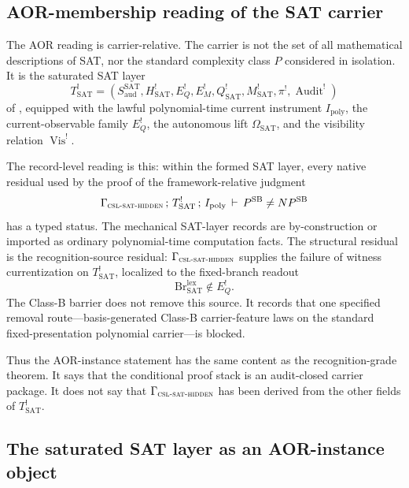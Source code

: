 \documentclass[11pt]{article}
\newcommand{\Tsat}{T^{!}_{\mathrm{SAT}}}
\newcommand{\Saud}{S_{\mathrm{aud}}^{\mathrm{SAT}}}
\newcommand{\Hsat}{H^{!}_{\mathrm{SAT}}}
\newcommand{\Ipoly}{I_{\mathrm{poly}}}
\newcommand{\EQbang}{E^{!}_{Q}}
\newcommand{\EMbang}{E^{!}_{M}}
\newcommand{\Qsat}{Q^{!}_{\mathrm{SAT}}}
\newcommand{\Msat}{M^{!}_{\mathrm{SAT}}}
\newcommand{\ComparisonMap}{\pi^{!}}
\newcommand{\OmegaSAT}{\Omega_{\mathrm{SAT}}}
\newcommand{\VisBang}{\operatorname{Vis}^{!}}
\newcommand{\CSLSATHidden}{\Gamma_{\textsc{csl-sat-hidden}}}
\newcommand{\BIJudgment}[4]{#1\,;\,#2\,;\,#3\,\vdash\,#4}
\newcommand{\PSB}{P^{\mathrm{SB}}}
\newcommand{\NPSB}{NP^{\mathrm{SB}}}
\theoremstyle{definition}
\begin{document}
\subsection{AOR-membership reading of the SAT carrier}

The AOR reading is carrier-relative.  The carrier is not the set of
all mathematical descriptions of SAT, nor the standard complexity
class \(P\) considered in isolation.  It is the saturated SAT layer
\[
  \Tsat
  =
  (\Saud,\Hsat,\EQbang,\EMbang,\Qsat,\Msat,\ComparisonMap,
    \operatorname{Audit}^{!})
\]
of , equipped with the lawful
polynomial-time current instrument \(\Ipoly\), the current-observable
family \(\EQbang\), the autonomous lift \(\OmegaSAT\), and the
visibility relation \(\VisBang\).

The record-level reading is this: within the formed SAT layer, every
native residual used by the proof of the framework-relative judgment
\[
  \BIJudgment{\CSLSATHidden}{\Tsat}{\Ipoly}{\PSB\neq\NPSB}
\]
has a typed status.  The mechanical SAT-layer records are
by-construction or imported as ordinary polynomial-time computation
facts.  The structural residual is the recognition-source residual:
\(\CSLSATHidden\) supplies the failure of witness currentization on
\(\Tsat\), localized to the fixed-branch readout
\[
  \mathrm{Br}^{\mathrm{lex}}_{\mathrm{SAT}}\notin\EQbang .
\]
The Class-B barrier does not remove this source.  It records that one
specified removal route---basis-generated Class-B carrier-feature
laws on the standard fixed-presentation polynomial carrier---is
blocked.

Thus the AOR-instance statement has the same content as the
recognition-grade theorem.  It says that the conditional proof stack
is an audit-closed carrier package.  It does not say that
\(\CSLSATHidden\) has been derived from the other fields of \(\Tsat\).

\subsection{The saturated SAT layer as an AOR-instance object}
\end{document}
